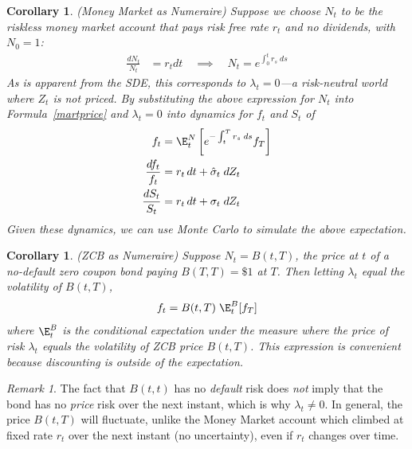 \documentclass[12pt]{article}
\theoremstyle{plain}
\newtheorem{cor}[thm]{Corollary}
\theoremstyle{definition}
\theoremstyle{remark}
\newtheorem*{rmk}{Remark}
\begin{document}
\clearpage




\begin{cor}\emph{(Money Market as Numeraire)}
Suppose we choose $N_t$ to be the riskless money market account that
pays risk free rate $r_t$ and no dividends, with $N_0=1$:
\begin{align}
  \frac{dN_{t}}{N_{t}}
  &=
  r_t
  dt
  \quad\implies\quad
  N_t=e^{\int_0^t r_s\;ds}
  \label{dNmoney}
\end{align}
As is apparent from the SDE, this corresponds to $\lambda_t=0$---a
risk-neutral world where $Z_t$ is not priced.
By substituting the above expression for $N_t$ into
Formula~\ref{martprice} and $\lambda_t=0$ into
dynamics for $f_t$ and $S_t$ of
\begin{align*}
  f_t
  &=
  \E_t^{N}
  \left[
  e^{-\int_t^T r_s\;ds}
  f_T
  \right]
  \\
  \frac{df_{t}}{f_{t}}
  &=
  r_t
  \,dt
  +
  \hat{\sigma}_{t}\;dZ_t
  \\
  \frac{dS_{t}}{S_{t}}
  &=
  r_t
  \,dt
  +
  \sigma_{t}\;dZ_t
\end{align*}
Given these dynamics, we can use Monte Carlo to simulate the above
expectation.
\end{cor}

\begin{cor}
\emph{(ZCB as Numeraire)}
Suppose $N_t=B(t,T)$, the price at $t$ of a no-default zero
coupon bond paying $B(T,T)=\$1$ at $T$. Then letting
$\lambda_t$ equal the volatility of $B(t,T)$,
\begin{align*}
  f_t
  =
  B(t,T)
  \;\E_t^B[f_T]
\end{align*}
where $\E^B_t$ is the conditional expectation under the measure where the
price of risk $\lambda_t$ equals the volatility of ZCB price $B(t,T)$.
This expression is convenient because discounting is \emph{outside}
of the expectation.
\end{cor}
\begin{rmk}
The fact that $B(t,t)$ has no \emph{default} risk does \emph{not} imply
that the bond has no \emph{price} risk over the next instant, which is
why $\lambda_t\neq 0$. In general, the price $B(t,T)$ will fluctuate,
unlike the Money Market account which climbed at fixed rate $r_t$ over
the next instant (no uncertainty), even if $r_t$ changes over time.
\end{rmk}
\end{document}
